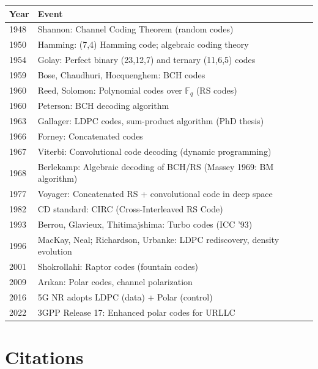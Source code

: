 \begin{tabularx}{\linewidth}{|l|X|}
\hline
\textbf{Year} & \textbf{Event} \\ \hline
1948 & Shannon: Channel Coding Theorem (random codes) \\ \hline
1950 & Hamming: (7,4) Hamming code; algebraic coding theory \\ \hline
1954 & Golay: Perfect binary (23,12,7) and ternary (11,6,5) codes \\ \hline
1959 & Bose, Chaudhuri, Hocquenghem: BCH codes \\ \hline
1960 & Reed, Solomon: Polynomial codes over $\mathbb{F}_q$ (RS codes) \\
 \hline
1960 & Peterson: BCH decoding algorithm \\
 \hline
1963 & Gallager: LDPC codes, sum-product algorithm (PhD thesis) \\
 \hline
1966 & Forney: Concatenated codes \\
 \hline
1967 & Viterbi: Convolutional code decoding (dynamic programming) \\
 \hline
1968 & Berlekamp: Algebraic decoding of BCH/RS (Massey 1969: BM algorithm) \\
 \hline
1977 & Voyager: Concatenated RS + convolutional code in deep space \\
 \hline
1982 & CD standard: CIRC (Cross-Interleaved RS Code) \\
 \hline
1993 & Berrou, Glavieux, Thitimajshima: Turbo codes (ICC '93) \\
 \hline
1996 & MacKay, Neal; Richardson, Urbanke: LDPC rediscovery, density evolution \\
 \hline
2001 & Shokrollahi: Raptor codes (fountain codes) \\
 \hline
2009 & Arıkan: Polar codes, channel polarization \\
 \hline
2016 & 5G NR adopts LDPC (data) + Polar (control) \\
 \hline
2022 & 3GPP Release 17: Enhanced polar codes for URLLC \\
 \hline
\end{tabularx}

\section{Citations}
\label{sec:ec:citations}

